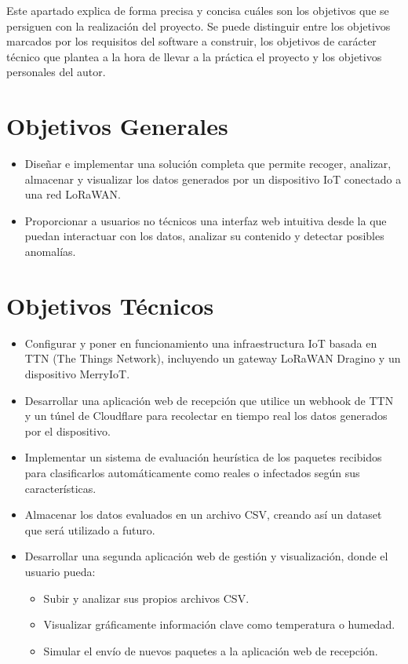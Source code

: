 
Este apartado explica de forma precisa y concisa cuáles son los objetivos que se persiguen con la realización del proyecto. Se puede distinguir entre los objetivos marcados por los requisitos del software a construir, los objetivos de carácter técnico que plantea a la hora de llevar a la práctica el proyecto y los objetivos personales del autor.

\section {Objetivos Generales}
\begin{itemize}
   \item Diseñar e implementar una solución completa que permite recoger, analizar, almacenar y visualizar los datos generados por un dispositivo IoT conectado a una red LoRaWAN.
    \item Proporcionar a usuarios no técnicos una interfaz web intuitiva desde la que puedan interactuar con los datos, analizar su contenido y detectar posibles anomalías.
\end{itemize}
\section {Objetivos Técnicos}
\begin{itemize}
   \item Configurar y poner en funcionamiento una infraestructura IoT basada en TTN (The Things Network), incluyendo un gateway LoRaWAN Dragino y un dispositivo MerryIoT.
    \item Desarrollar una aplicación web de recepción que utilice un webhook de TTN y un túnel de Cloudflare para recolectar en tiempo real los datos generados por el dispositivo.
    \item Implementar un sistema de evaluación heurística de los paquetes recibidos para clasificarlos automáticamente  como reales o infectados según sus características.
    \item Almacenar los datos evaluados en un archivo CSV, creando así un dataset que será utilizado a futuro.
    \item Desarrollar una segunda aplicación web de gestión y visualización, donde el usuario pueda:
    \begin{itemize}
     \item Subir y analizar sus propios archivos CSV.
     \item Visualizar gráficamente información clave como temperatura o humedad.
     \item Simular el envío de nuevos paquetes a la aplicación web de recepción.
     \end{itemize}
\end{itemize}
